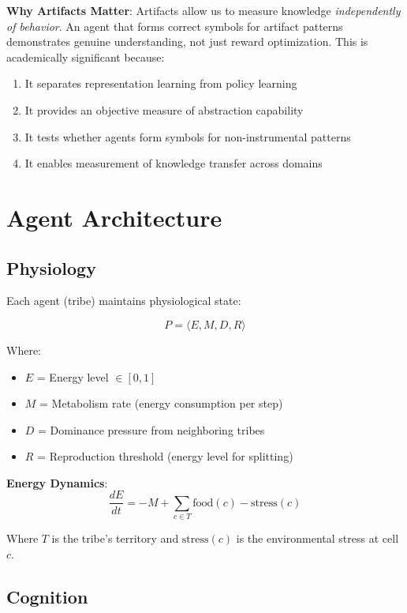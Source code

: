\documentclass[11pt,a4paper]{article}
\begin{document}
\textbf{Why Artifacts Matter}:
Artifacts allow us to measure knowledge \textit{independently of behavior}. An agent that forms correct symbols for artifact patterns demonstrates genuine understanding, not just reward optimization. This is academically significant because:

\begin{enumerate}
    \item It separates representation learning from policy learning
    \item It provides an objective measure of abstraction capability
    \item It tests whether agents form symbols for non-instrumental patterns
    \item It enables measurement of knowledge transfer across domains
\end{enumerate}

\section{Agent Architecture}

\subsection{Physiology}

Each agent (tribe) maintains physiological state:

\begin{equation}
P = \langle E, M, D, R \rangle
\end{equation}

Where:
\begin{itemize}
    \item $E$ = Energy level $\in [0, 1]$
    \item $M$ = Metabolism rate (energy consumption per step)
    \item $D$ = Dominance pressure from neighboring tribes
    \item $R$ = Reproduction threshold (energy level for splitting)
\end{itemize}

\textbf{Energy Dynamics}:
\begin{equation}
\frac{dE}{dt} = -M + \sum_{c \in T} \text{food}(c) - \text{stress}(c)
\end{equation}

Where $T$ is the tribe's territory and $\text{stress}(c)$ is the environmental stress at cell $c$.

\subsection{Cognition}
\end{document}
